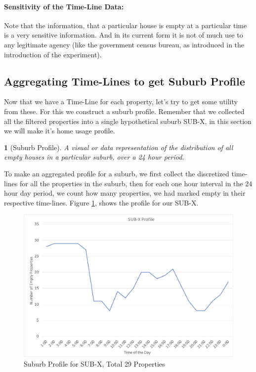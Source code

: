 \documentclass[12pt]{report}
\theoremstyle{named}
\newtheorem*{namedtheorem}{}
\begin{document}
\paragraph{Sensitivity of the Time-Line Data:\\}
Note that the information, that a particular house is empty at a particular time is a very sensitive information. And in its current form it is not of much use to any legitimate agency (like the government census bureau, as introduced in the introduction of the experiment). 
\subsection{Aggregating Time-Lines to get Suburb Profile}
Now that we have a Time-Line for each property, let's try to get some utility from these. For this we construct a suburb profile. Remember that we collected all the filtered properties into a single hypothetical suburb SUB-X, in this section we will make it's home usage profile. 
\begin{namedtheorem}[Suburb Profile] A visual or data representation of the distribution of all empty houses in a particular suburb, over a 24 hour period.
\end{namedtheorem}

To make an aggregated profile for a suburb, we first collect the discretized time-lines for all the properties in the suburb, then for each one hour interval in the 24 hour day period, we count how many properties, we had marked empty in their respective time-lines. Figure \ref{fig:SubXProfile}, shows the profile for our SUB-X.

\begin{figure}[ht]
\centering
        \includegraphics[width=150mm,scale=1]{Images/SubXProfile.png}
    \caption{Suburb Profile for SUB-X, Total 29 Properties}
    \label{fig:SubXProfile}
\end{figure}
\end{document}
